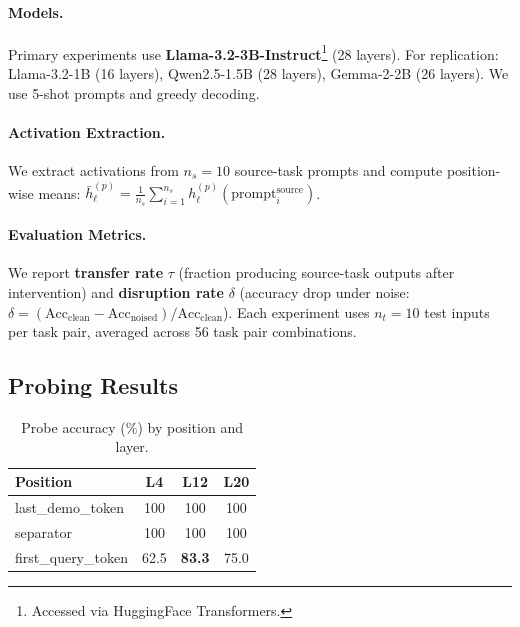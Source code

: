 \documentclass{article}
\begin{document}
\paragraph{Models.} Primary experiments use \textbf{Llama-3.2-3B-Instruct}\footnote{Accessed via HuggingFace Transformers.} (28 layers). For replication: Llama-3.2-1B (16 layers), Qwen2.5-1.5B \citep{bai2023qwen} (28 layers), Gemma-2-2B \citep{team2024gemma} (26 layers). We use 5-shot prompts and greedy decoding.

\paragraph{Activation Extraction.} We extract activations from $n_s = 10$ source-task prompts and compute position-wise means: $\bar{h}_\ell^{(p)} = \frac{1}{n_s} \sum_{i=1}^{n_s} h_\ell^{(p)}(\text{prompt}_i^{\text{source}})$.

\paragraph{Evaluation Metrics.} We report \textbf{transfer rate} $\tau$ (fraction producing source-task outputs after intervention) and \textbf{disruption rate} $\delta$ (accuracy drop under noise: $\delta = (\text{Acc}_{\text{clean}} - \text{Acc}_{\text{noised}}) / \text{Acc}_{\text{clean}}$). Each experiment uses $n_t = 10$ test inputs per task pair, averaged across 56 task pair combinations.

\subsection{Probing Results}

\begin{table}
\vspace{-12pt}
\centering
\small
\caption{Probe accuracy (\%) by position and layer.}
\label{tab:probing}
\begin{tabular}{@{}lccc@{}}
\toprule
Position & L4 & L12 & L20 \\
\midrule
last\_demo\_token & 100 & 100 & 100 \\
separator & 100 & 100 & 100 \\
first\_query\_token & 62.5 & \textbf{83.3} & 75.0 \\
\bottomrule
\end{tabular}
\vspace{-10pt}
\end{table}
\end{document}
